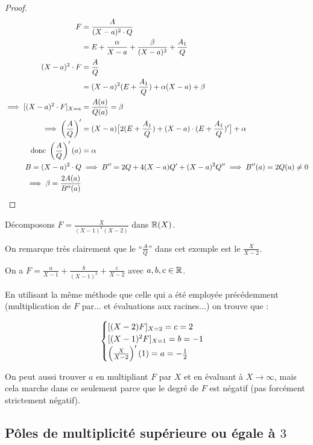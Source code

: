 \documentclass[12pt, a4paper]{report}
\begin{document}
\begin{proof}
    \begin{align*}
    F &= \frac{A}{(X - a)^2 \cdot Q}
    \\
      &= E + \frac{\alpha}{X - a} + \frac{\beta}{(X - a)^2} + \frac{A_1}{Q}
    \\
    (X - a)^2 \cdot F &= \frac AQ
    \\
      &= (X-a)^2(E+\frac{A_1}{Q}) + \alpha(X-a)+ \beta
    \\
    \implies [(X-a)^2 \cdot F]_{X=a} &= \frac{A(a)}{Q(a)} = \beta
    \\
    \implies \left(\frac AQ\right)' &= (X-a)\big[2(E+\frac{A_1}{Q}) + (X-a)\cdot(E+\frac{A_1}{Q})'\big]+\alpha
    \\
    \text{ donc } \left(\frac AQ\right)'(a) &= \alpha
    \\
    B = (X-a)^2 \cdot Q &\implies B'' = 2Q + 4(X-a)Q' + (X-a)^2 Q'' \implies B''(a) = 2Q(a) \neq 0
    \\
    \implies \beta = \frac{2A(a)}{B''(a)}
    \end{align*}
\end{proof}

\begin{example}
    Décomposons $F = \frac{X}{(X-1)^2(X-2)}$ dans $\mathbb{R}(X)$.

    On remarque très clairement que le ``$\frac AQ$'' dans cet exemple est le $\frac{X}{X-2}$.

    On a $F = \frac{a}{X-1} + \frac{b}{(X-1)^2} + \frac{c}{X-2}$ avec $a,b,c \in \mathbb{R}$.

    En utilisant la même méthode que celle qui a été employée précédemment (multiplication de $F$ par... et évaluations aux racines...) on trouve que :

    $$\begin{cases}
    [(X-2)F]_{X=2} = c = 2\\
    [(X-1)^2 F]_{X=1} = b = -1\\
    \left(\frac{X}{X-2}\right)'(1) = a = -\frac12
    \end{cases}$$

    On peut aussi trouver $a$ en multipliant $F$ par $X$ et en évaluant à $X\to\infty$, mais cela marche dans ce seulement parce que le degré de $F$ est négatif (pas forcément strictement négatif).
\end{example}

\subsection{Pôles de multiplicité supérieure ou égale à $3$}
\end{document}
